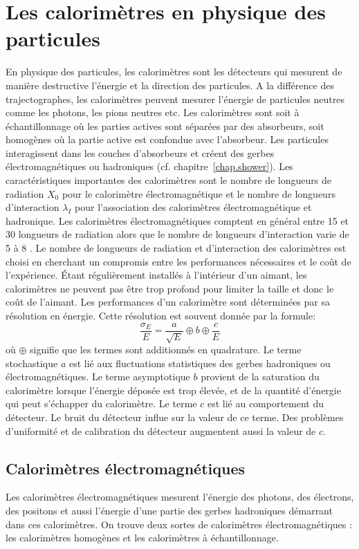 \section{Les calorimètres en physique des particules}
En physique des particules, les calorimètres sont les détecteurs qui mesurent de manière destructive l'énergie et la direction des particules. A  la différence des trajectographes, les calorimètres peuvent mesurer l'énergie de particules neutres comme les photons, les pions neutres etc. Les calorimètres sont soit à échantillonnage où les parties actives sont séparées par des absorbeurs, soit homogènes où la partie active est confondue avec l'absorbeur. Les particules interagissent dans les couches d'absorbeurs et créent des gerbes électromagnétiques ou hadroniques (cf. chapitre~\ref{chap.shower}). Les caractéristiques importantes des calorimètres sont le nombre de longueurs de radiation $X_0$ pour le calorimètre électromagnétique et le nombre de longueurs d'interaction $\lambda_I$ pour l'association des calorimètres électromagnétique et hadronique. Les calorimètres électromagnétiques comptent en général entre 15 et 30 longueurs de radiation alors que le nombre de longueurs d'interaction varie de 5 à 8 \cite{pdg}. Le nombre de longueurs de radiation et d'interaction des calorimètres est choisi en cherchant un compromis entre les performances nécessaires et le coût de l'expérience. Étant régulièrement installés à l'intérieur d'un aimant, les calorimètres ne peuvent pas être trop profond pour limiter la taille et donc le coût de l'aimant. Les performances d'un calorimètre sont déterminées par sa résolution en énergie. Cette résolution est souvent donnée par la formule:
\begin{equation}
  \frac{\sigma_E}{E}=\frac{a}{\sqrt{E}} \oplus b \oplus \frac{c}{E}
  \label{eq.calo_resol}
\end{equation}
où $\oplus$ signifie que les termes sont additionnés en quadrature. Le terme stochastique $a$ est lié aux fluctuations statistiques des gerbes hadroniques ou électromagnétiques. Le terme asymptotique $b$ provient de la saturation du calorimètre lorsque l'énergie déposée est trop élevée, et de la quantité d'énergie qui peut s'échapper du calorimètre. Le terme $c$ est lié au comportement du détecteur. Le bruit du détecteur influe sur la valeur de ce terme. Des problèmes d'uniformité et de calibration du détecteur augmentent aussi la valeur de $c$. 

\subsection{Calorimètres électromagnétiques}
Les calorimètres électromagnétiques mesurent l'énergie des photons, des électrons, des positons et aussi l'énergie d'une partie des gerbes hadroniques démarrant dans ces calorimètres. On trouve deux sortes de calorimètres électromagnétiques : les calorimètres homogènes et les calorimètres à échantillonnage. 

